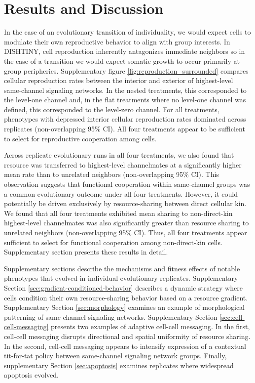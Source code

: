 \section{Results and Discussion}

In the case of an evolutionary transition of individuality, we would expect cells to modulate their own reproductive behavior to align with group interests.
In DISHTINY, cell reproduction inherently antagonizes immediate neighbors so in the case of a transition we would expect somatic growth to occur primarily at group peripheries.
Supplementary figure \ref{fig:reproduction_surrounded} compares cellular reproduction rates between the interior and exterior of highest-level same-channel signaling networks.
In the nested treatments, this corresponded to the level-one channel and, in the flat treatments where no level-one channel was defined, this corresponded to the level-zero channel.
For all treatments, phenotypes with depressed interior cellular reproduction rates dominated across replicates (non-overlapping 95\% CI).
All four treatments appear to be sufficient to select for reproductive cooperation among cells.

Across replicate evolutionary runs in all four treatments, we also found that resource was transferred to highest-level channelmates at a significantly higher mean rate than to unrelated neighbors (non-overlapping 95\% CI).
This observation suggests that functional cooperation within same-channel groups was a common evolutionary outcome under all four treatments.
However, it could potentially be driven exclusively by resource-sharing between direct cellular kin.
We found that all four treatments exhibited mean sharing to non-direct-kin highest-level channelmates was also significantly greater than resource sharing to unrelated neighbors (non-overlapping 95\% CI).
Thus, all four treatments appear sufficient to select for functional cooperation among non-direct-kin cells.
Supplementary section \label{sec:resource-sharing} presents these results in detail.

Supplementary sections describe the mechanisms and fitness effects of notable phenotypes that evolved in individual evolutionary replicates.
Supplementary Section \ref{sec:gradient-conditioned-behavior} describes a dynamic strategy where cells condition their own resource-sharing behavior based on a resource gradient.
Supplementary Section \ref{sec:morphology} examines an example of morphological patterning of same-channel signaling networks.
Supplementary Section \ref{sec:cell-cell-messaging} presents two examples of adaptive cell-cell messaging.
In the first, cell-cell messaging disrupts directional and spatial uniformity of resource sharing.
In the second, cell-cell messaging appears to intensify expression of a contextual tit-for-tat policy between same-channel signaling network groups.
Finally, supplementary Section \ref{sec:apoptosis} examines replicates where widespread apoptosis evolved.

